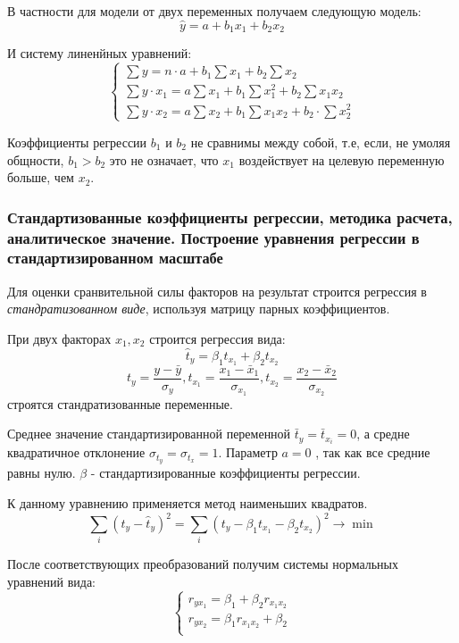 \documentclass[aps,%
12pt,%
final,%
oneside,
onecolumn,%
musixtex, %
superscriptaddress,%
centertags]{article} %
\theoremstyle{plain}
\theoremstyle{definition}
\theoremstyle{remark}
\begin{document}
В частности для модели от двух переменных получаем следующую модель:
$$ \widehat{y} = a +b_1x_1 + b_2x_2$$

И систему линенйных уравнений:
$$\left \{
\begin{matrix}
	\sum y = n \cdot a + b_1 \sum x_1 + b_2 \sum x_2 \\[0.3cm]
	\sum y \cdot x_1 = a \sum x_1 + b_1 \sum x_1^2 + b_2 \sum x_1x_2\\[0.3cm]
	\sum y \cdot x_2 = a\sum x_2 + b_1 \sum x_1x_2 + b_2 \cdot \sum x_2^2
\end{matrix}
\right.
$$

Коэффициенты регрессии $b_1$ и $b_2$ не сравнимы между собой, т.е, если, не умоляя общности, $b_1>b_2$ это не означает, что $x_1$ воздействует на целевую переменную больше, чем $x_2$.


\subsubsection{Стандартизованные коэффициенты регрессии, методика расчета, аналитическое значение. Построение уравнения регрессии в стандартизированном масштабе}

Для оценки сранвительной силы факторов на результат строится регрессия в \textit{стандратизованном виде}, используя матрицу парных коэффициентов. 

При двух факторах $x_1,x_2$ строится регрессия вида:
$$ \hat{t}_y = \beta_1t_{x_1} + \beta_2t_{x_2} $$
$$t_{y} = \frac{y-\bar{y}}{\sigma_y}, t_{x_1} = \frac{x_{1}-\bar{x}_1}{\sigma_{x_1}}, t_{x_2} = \frac{x_{2}-\bar{x}_2}{\sigma_{x_2}}$$
строятся стандратизованные переменные. 

Среднее значение стандартизированной переменной  $\bar{t}_y = \bar{t}_{x_i} = 0$, а средне квадратичное отклонение $\sigma_{t_y} = \sigma_{t_x} = 1$. Параметр $a=0$ , так как все средние равны нулю. $\beta$ - стандартизированные коэффициенты регрессии. 

К данному уравнению применяется метод наименьших квадратов.
$$ \sum_{i} (t_{y} - \hat{t}_y)^2 = \sum_i (t_y - \beta_1t_{x_1} - \beta_2 t_{x_2})^2 \to \min $$

После соответствующих преобразований получим системы нормальных уравнений вида:
$$\left \{
\begin{matrix}
r_{yx_1} = \beta_1 + \beta_2r_{x_1 x_2} \\
r_{yx_2} = \beta_1r_{x_1 x_2} + \beta_2 \\
\end{matrix}
\right.
$$
\end{document}
